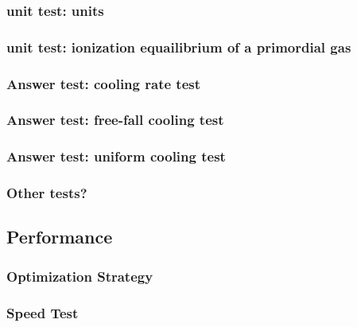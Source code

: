 \subsubsection{unit test: units}
\label{sec:unit-test}

\subsubsection{unit test: ionization equailibrium of a primordial gas}
\label{sec:primordial-test}

\subsubsection{Answer test: cooling rate test}
\label{sec:cooling-rate-test}

\subsubsection{Answer test: free-fall cooling test}
\label{sec:free-fall-test}

\subsubsection{Answer test: uniform cooling test}
\label{sec:uniform-cooling-test}

\subsubsection{Other tests?}


\subsection{Performance}


\subsubsection{Optimization Strategy}


\subsubsection{Speed Test}
